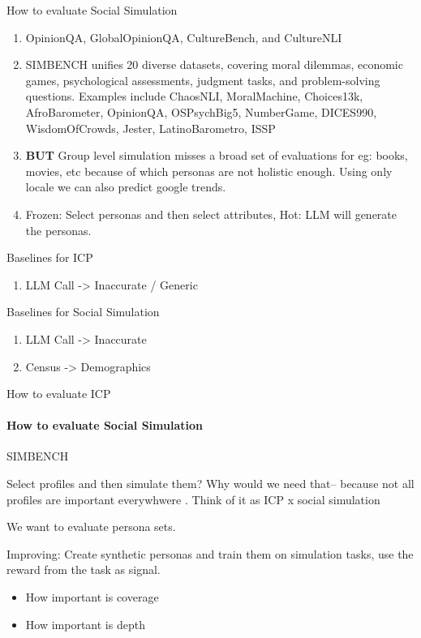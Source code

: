 How to evaluate Social Simulation
\begin{enumerate}
    \item OpinionQA, GlobalOpinionQA, CultureBench, and CultureNLI
    \item SIMBENCH unifies 20 diverse datasets, covering moral dilemmas, economic games, psychological assessments, judgment tasks, and problem-solving questions. Examples include ChaosNLI, MoralMachine, Choices13k, AfroBarometer, OpinionQA, OSPsychBig5, NumberGame, DICES990, WisdomOfCrowds, Jester, LatinoBarometro, ISSP
    \item \textbf{BUT} Group level simulation misses a broad set of evaluations for eg: books, movies, etc because of which personas are not holistic enough. Using only locale we can also predict google trends.
    \item Frozen: Select personas and then select attributes, Hot: LLM will generate the personas.
\end{enumerate}


Baselines for ICP
\begin{enumerate}
    \item LLM Call -> Inaccurate / Generic
\end{enumerate}

Baselines for Social Simulation
\begin{enumerate}
    \item LLM Call -> Inaccurate
    \item Census -> Demographics
\end{enumerate}


How to evaluate ICP



\paragraph{How to evaluate Social Simulation}

SIMBENCH 



Select profiles and then simulate them? Why would we need that-- because not all profiles are important everywhwere . Think of it as ICP x social simulation


We want to evaluate persona sets. 

Improving: Create synthetic personas and train them on simulation tasks, use the reward from the task as signal.





\begin{itemize}
    \item How important is coverage
    \item How important is depth
\end{itemize}


